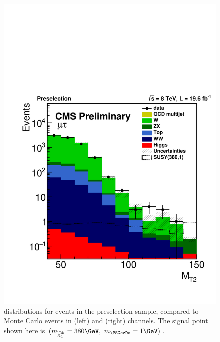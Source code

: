 \begin{figure}[!Hhtb]
\includegraphics[angle=0,scale=0.375]{SelectionMuTau/MT2_Ratio_Preselection_unBlinded.pdf}
\caption{\mttwo  distributions for events in the preselection sample, compared to Monte Carlo events in (left) \eTau and (right) \muTau channels. The signal point shown here is $(m_{\chione}=380\GeV,~m_{\PSGczDo}=1\GeV)$.}
\label{fig:mt2leptontau}
\end{figure}

